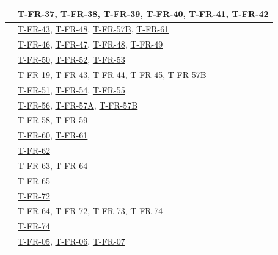 \documentclass[12pt, titlepage]{article}
\providecommand{\descriptiveid}[1]{\texttt{\detokenize{#1}}}
\providecommand{\rref}[1]{\descriptiveid{#1}}
\begin{document}
\begin{longtable}{p{} p{}}
    \rref{FR_ThreadsNotify} & \hyperref[T-FR-37]{T-FR-37}, \hyperref[T-FR-38]{T-FR-38}, \hyperref[T-FR-39]{T-FR-39}, \hyperref[T-FR-40]{T-FR-40}, \hyperref[T-FR-41]{T-FR-41}, \hyperref[T-FR-42]{T-FR-42} \\ \hline
    \rref{FR_RequestApproval} & \hyperref[T-FR-43]{T-FR-43}, \hyperref[T-FR-48]{T-FR-48}, \hyperref[T-FR-57B]{T-FR-57B}, \hyperref[T-FR-61]{T-FR-61} \\ \hline
    \rref{FR_ApprovalResponse} & \hyperref[T-FR-46]{T-FR-46}, \hyperref[T-FR-47]{T-FR-47}, \hyperref[T-FR-48]{T-FR-48}, \hyperref[T-FR-49]{T-FR-49} \\ \hline
    \rref{FR_ExternalApproval} & \hyperref[T-FR-50]{T-FR-50}, \hyperref[T-FR-52]{T-FR-52}, \hyperref[T-FR-53]{T-FR-53} \\ \hline
    \rref{FR_ApprovalPreflightValidate} & \hyperref[T-FR-19]{T-FR-19}, \hyperref[T-FR-43]{T-FR-43}, \hyperref[T-FR-44]{T-FR-44}, \hyperref[T-FR-45]{T-FR-45}, \hyperref[T-FR-57B]{T-FR-57B} \\ \hline
    \rref{FR_ApprovalRevision} & \hyperref[T-FR-51]{T-FR-51}, \hyperref[T-FR-54]{T-FR-54}, \hyperref[T-FR-55]{T-FR-55} \\ \hline
    \rref{FR_DisableFeatures} & \hyperref[T-FR-56]{T-FR-56}, \hyperref[T-FR-57A]{T-FR-57A}, \hyperref[T-FR-57B]{T-FR-57B} \\ \hline
    \rref{FR_ReferenceMaterial} & \hyperref[T-FR-58]{T-FR-58}, \hyperref[T-FR-59]{T-FR-59} \\ \hline
    \rref{FR_RequiredActionsList} & \hyperref[T-FR-60]{T-FR-60}, \hyperref[T-FR-61]{T-FR-61} \\ \hline
    \rref{FR_ActionRequiredEmail} & \hyperref[T-FR-62]{T-FR-62} \\ \hline
    \rref{FR_ReadCourseInformation} & \hyperref[T-FR-63]{T-FR-63}, \hyperref[T-FR-64]{T-FR-64} \\ \hline
    \rref{FR_ExportCourseInformation} & \hyperref[T-FR-65]{T-FR-65} \\ \hline
    \rref{FR_MacSSO} & \hyperref[T-FR-72]{T-FR-72} \\ \hline
    \rref{FR_AuthorizationRBAC} & \hyperref[T-FR-64]{T-FR-64}, \hyperref[T-FR-72]{T-FR-72}, \hyperref[T-FR-73]{T-FR-73}, \hyperref[T-FR-74]{T-FR-74} \\ \hline
    \rref{FR_UpdateRoles} & \hyperref[T-FR-74]{T-FR-74} \\ \hline
    \rref{FR_ExternalSupervisorVerification} & \hyperref[T-FR-05]{T-FR-05}, \hyperref[T-FR-06]{T-FR-06}, \hyperref[T-FR-07]{T-FR-07} \\ \hline

\end{longtable}
\end{document}
